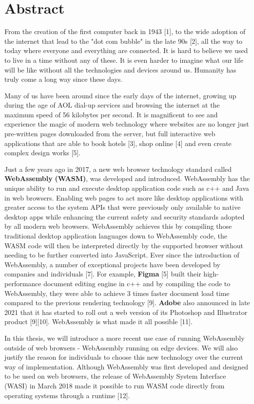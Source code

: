 \chapter*{Abstract}

From the creation of the first computer back in 1943 [1], to the wide adoption of the internet that lead to the "dot com bubble" in the late 90s [2], all the way to today where everyone and everything are connected. It is hard to believe we used to live in a time without any of these. It is even harder to imagine what our life will be like without all the technologies and devices around us. Humanity has truly come a long way since these days.

Many of us have been around since the early days of the internet, growing up during the age of AOL dial-up services and browsing the internet at the maximum speed of 56 kilobytes per second. It is magnificent to see and experience the magic of modern web technology where websites are no longer just pre-written pages downloaded from the server, but full interactive web applications that are able to book hotels [3], shop online [4] and even create complex design works [5].

Just a few years ago in 2017, a new web browser technology standard called \textbf{WebAssembly} \textbf{(WASM)}, was developed and introduced. WebAssembly has the unique ability to run and execute desktop application code such as c++ and Java in web browsers. Enabling web pages to act more like desktop applications with greater access to the system APIs that were previously only available to native desktop apps while enhancing the current safety and security standards adopted by all modern web browsers. WebAssembly achieves this by compiling those traditional desktop application languages down to WebAssembly code, the WASM code will then be interpreted directly by the supported browser without needing to be further converted into JavaScript. Ever since the introduction of WebAssembly, a number of exceptional projects have been developed by companies and individuals [7]. For example, \textbf{Figma} [5] built their high-performance document editing engine in c++ and by compiling the code to WebAssembly, they were able to achieve 3 times faster document load time compared to the previous rendering technology [9]. \textbf{Adobe} also announced in late 2021 that it has started to roll out a web version of its Photoshop and Illustrator product [9][10]. WebAssembly is what made it all possible [11].

In this thesis, we will introduce a more recent use case of running WebAssembly outside of web browsers - WebAssembly running on edge devices. We will also justify the reason for individuals to choose this new technology over the current way of implementation. Although WebAssembly was first developed and designed to be used on web browsers, the release of WebAssembly System Interface (WASI) in March 2018 made it possible to run WASM code directly from operating systems through a runtime [12].

